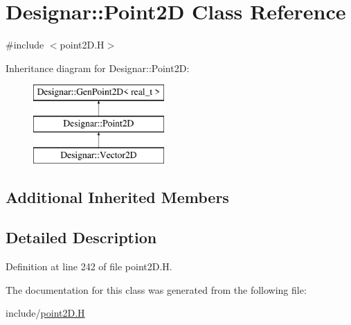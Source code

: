 \hypertarget{class_designar_1_1_point2_d}{}\section{Designar\+:\+:Point2D Class Reference}
\label{class_designar_1_1_point2_d}


{\ttfamily \#include $<$point2\+D.\+H$>$}

Inheritance diagram for Designar\+:\+:Point2D\+:\begin{figure}[H]
\begin{center}
\leavevmode
\includegraphics[height=3.000000cm]{class_designar_1_1_point2_d}
\end{center}
\end{figure}
\subsection*{Additional Inherited Members}


\subsection{Detailed Description}


Definition at line 242 of file point2\+D.\+H.



The documentation for this class was generated from the following file\+:\begin{DoxyCompactItemize}
\item 
include/\hyperlink{point2_d_8_h}{point2\+D.\+H}\end{DoxyCompactItemize}
